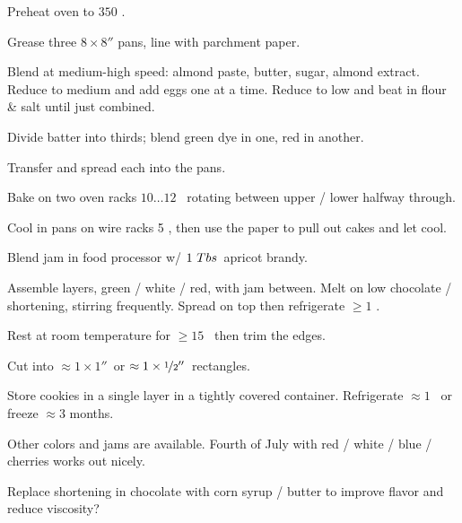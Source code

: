 \begin{preparation}
\item Preheat oven to $350$ \Fahrenheit.

\item Grease three $8\times8''$ pans, line with parchment paper.

\item Blend at medium-high speed: almond paste, butter, sugar, almond extract.
Reduce to medium and add eggs one at a time.
Reduce to low and beat in flour \& salt until just combined.

\item Divide batter into thirds; blend green dye in one, red in another.

\item Transfer and spread each into the pans.

\item Bake on two oven racks $10 \dots 12$ \minute~rotating between upper / lower halfway through.

\item Cool in pans on wire racks 5 \minute,
	then use the paper to pull out cakes and let cool.

\item Blend jam in food processor w/ $1~Tbs$~apricot brandy.

\item Assemble layers, green / white / red, with jam between.
	Melt on low chocolate / shortening, stirring frequently.
	Spread on top then refrigerate $\geq1$ \hour.

\item Rest at room temperature for $\geq 15$ \minute~then trim the edges.

\item Cut into $\approx 1\times 1''$~or $\approx 1\times \nicefrac{1}{2}''$~rectangles.

\item Store cookies in a single layer in a tightly covered container.
	Refrigerate $\approx 1$ \week~or freeze $\approx 3$ months.
\end{preparation}


\begin{variation}
\item Other colors and jams are available.
	Fourth of July with red / white / blue / cherries works out nicely.
\end{variation}


\begin{experiments}
\item Replace shortening in chocolate with corn syrup / butter to improve flavor and reduce viscosity?
\end{experiments}


\recipeend%
